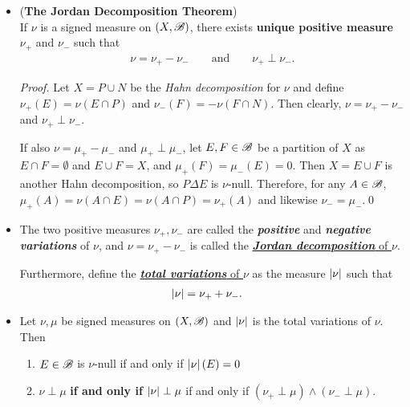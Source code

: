 \documentclass[11pt]{article}
\begin{document}
\begin{itemize}
\item  \begin{theorem}(\textbf{The Jordan Decomposition Theorem})\citep{folland2013real}\\
If $\nu$ is a signed measure on $(X,{\mathscr B})$, there exists \textbf{unique positive measure} $\nu_{+}$ and  $\nu_{-}$ such that 
\begin{align*}
\nu = \nu_{+} - \nu_{-} \qquad \text{and} \qquad \nu_{+} \perp \nu_{-}.
\end{align*}
\end{theorem}
\begin{proof}
Let $X = P\cup N$ be the \emph{Hahn decomposition} for $\nu$ and define $\nu_{+}(E)= \nu(E\cap P)$ and $\nu_{-}(F)= -\nu(F\cap N)$. Then clearly, $\nu = \nu_{+} - \nu_{-} $ and $\nu_{+} \perp \nu_{-}$. 

If also $\nu = \mu_{+} - \mu_{-}$ and $\mu_{+} \perp \mu_{-}$, let $E,F\in {\mathscr B}$ be a partition of $X$ as $E\cap F = \emptyset$ and $E\cup F= X$, and $\mu_{+}(F) = \mu_{-}(E)= 0$. Then $X= E\cup F$ is another Hahn decomposition, so $P\Delta E $ is $\nu$-null. Therefore, for any $A\in {\mathscr B}$, $\mu_{+}(A) = \nu(A\cap E) = \nu(A\cap P)= \nu_{+}(A)$ and likewise $\nu_{-}= \mu_{-}$.\qed 
\end{proof}

\item \begin{definition}
The two positive measures $\nu_{+}, \nu_{-}$ are called the \emph{\textbf{positive}} and \emph{\textbf{negative variations}} of $\nu$, and $\nu= \nu_{+} - \nu_{-} $ is called the   \underline{\emph{\textbf{Jordan decomposition}} of $\nu$}.

Furthermore, define the \underline{\emph{\textbf{total variations}} of $\nu$} as the measure $\left\lvert \nu \right\rvert$ such that 
\begin{align*}
\left\lvert \nu \right\rvert &=  \nu_{+} + \nu_{-}.
\end{align*}
\end{definition}

\item \begin{proposition}
Let $\nu, \mu$ be  signed measures on $(X, {\mathscr B})$ and $\left\lvert \nu \right\rvert$ is the total variations of $\nu$.  Then
\begin{enumerate}
\item $E \in {\mathscr B}$ is $\nu$-null if and only if $\left\lvert \nu \right\rvert(E)=0$
\item $\nu \perp \mu$ \textbf{if and only if} $\left\lvert \nu \right\rvert\perp \mu$ if and only if $(\nu_{+} \perp \mu) \wedge (\nu_{-} \perp \mu)$.
\end{enumerate}
\end{proposition}


\end{itemize}
\end{document}

